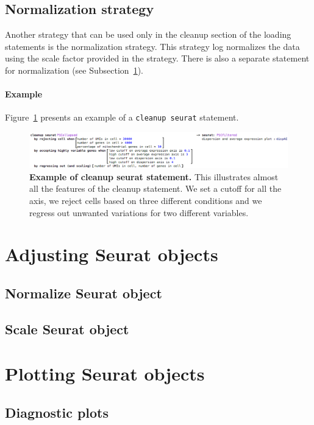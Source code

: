 \subsection{Normalization strategy}
Another strategy that can be used only in the cleanup section of the loading statements is the
normalization strategy. This strategy log normalizes the data using the scale factor provided
in the strategy. There is also a separate statement for normalization (see
Subsection~\ref{fig:ExampleCleanupSeurat}).

\paragraph{Example} Figure~\ref{fig:ExampleCleanupSeurat} presents an example of a
\texttt{cleanup seurat} statement.

\begin{figure}[h!tbp]
  \centering
  \includegraphics[width=\figWidthWide]{figures/ExampleCleanupSeurat.png}
    \caption[Example of cleanup seurat statement.]{\textbf{Example of cleanup seurat statement.}
    This illustrates almost all the features of the cleanup statement. We set a cutoff for
    all the axis, we reject cells based on three different conditions and we regress out
    unwanted variations for two different variables.}
\label{fig:ExampleCleanupSeurat}
\end{figure}

\section{Adjusting Seurat objects}
\subsection{Normalize Seurat object}
\subsection{Scale Seurat object}

\section{Plotting Seurat objects}
\subsection{Diagnostic plots}\label{subsec:DiagnosticPlots}
